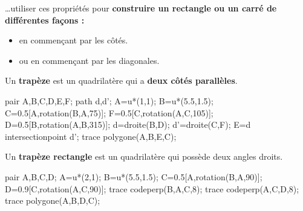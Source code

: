 \begin{changemargin}{-5mm}{-15mm}
    \begin{remarque}

        \ldots utiliser ces propriétés pour \textbf{construire un rectangle ou un carré de différentes fa\c cons :}        
        \begin{itemize}
            \item en commen\c cant par les côtés.
            \item ou en commen\c cant par les diagonales.
        \end{itemize}
    \end{remarque}
    
    \begin{definition}        
        \begin{minipage}{0.7\linewidth}
            Un \textbf{trapèze} est un quadrilatère qui a \textbf{deux côtés parallèles}.
        \end{minipage}
        \hfill
        \begin{minipage}{0.3\linewidth}
            \begin{center}
                \begin{Geometrie}
                    pair A,B,C,D,E,F;
                    path d,d';
                    A=u*(1,1);
                    B=u*(5.5,1.5);
                    C=0.5[A,rotation(B,A,75)];
                    F=0.5[C,rotation(A,C,105)];
                    D=0.5[B,rotation(A,B,315)];
                    d=droite(B,D);
                    d'=droite(C,F);
                    E=d intersectionpoint d';
                    trace polygone(A,B,E,C);
                \end{Geometrie} 
            \end{center}
        \end{minipage}
    \end{definition}
  
    \begin{definition}        
        \begin{minipage}{0.7\linewidth}
            Un \textbf{trapèze rectangle} est un quadrilatère qui possède deux angles droits.
        \end{minipage}
        \hfill
        \begin{minipage}{0.3\linewidth}
            \begin{center}
                \begin{Geometrie}
                    pair A,B,C,D;
                    A=u*(2,1);
                    B=u*(5.5,1.5);
                    C=0.5[A,rotation(B,A,90)];
                    D=0.9[C,rotation(A,C,90)];
                    trace codeperp(B,A,C,8);
                    trace codeperp(A,C,D,8);
                    trace polygone(A,B,D,C);
                \end{Geometrie} 
            \end{center}
        \end{minipage}
    \end{definition}
\end{changemargin}
 
